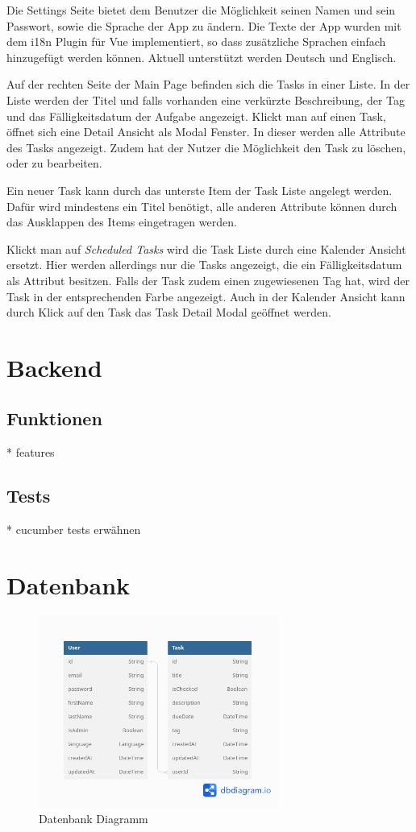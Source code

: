 \documentclass[a4paper, 12pt]{article}
\begin{document}
    Die Settings Seite bietet dem Benutzer die Möglichkeit seinen Namen und sein Passwort, sowie die Sprache der App zu ändern. Die Texte der App wurden mit dem i18n Plugin für Vue implementiert, so dass zusätzliche Sprachen einfach
    hinzugefügt werden können. Aktuell unterstützt werden Deutsch und Englisch.

    Auf der rechten Seite der Main Page befinden sich die Tasks in einer Liste. In der Liste werden der Titel und falls vorhanden eine verkürzte Beschreibung, der Tag und das Fälligkeitsdatum der Aufgabe angezeigt.
    Klickt man auf einen Task, öffnet sich eine Detail Ansicht als Modal Fenster. In dieser werden alle Attribute des Tasks angezeigt. Zudem hat der Nutzer die Möglichkeit den Task zu löschen, oder zu bearbeiten.

    Ein neuer Task kann durch das unterste Item der Task Liste angelegt werden. Dafür wird mindestens ein Titel benötigt, alle anderen Attribute können durch das Ausklappen des Items eingetragen werden.

    Klickt man auf {\it Scheduled Tasks} wird die Task Liste durch eine Kalender Ansicht ersetzt. Hier werden allerdings nur die Tasks angezeigt, die ein Fälligkeitsdatum als Attribut besitzen. Falls der Task zudem einen zugewiesenen Tag hat, wird der Task in der entsprechenden Farbe angezeigt.
    Auch in der Kalender Ansicht kann durch Klick auf den Task das Task Detail Modal geöffnet werden.


    \section{Backend}
    \subsection{Funktionen}
    * features

    \subsection{Tests}
    * cucumber tests erwähnen

    \section{Datenbank}
    \begin{figure}[H]
        \center\includegraphics[width=0.7\textwidth]{../images/database}
        \caption{Datenbank Diagramm}\label{fig:figure}
    \end{figure}
\end{document}
